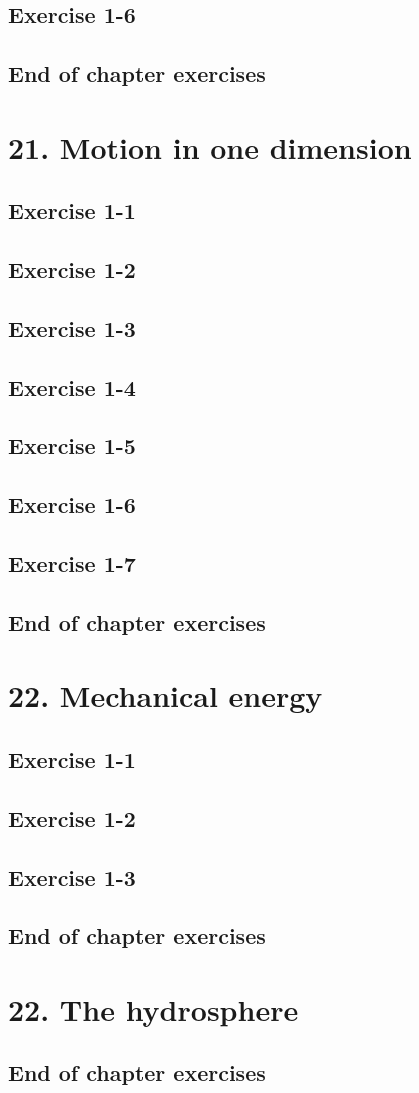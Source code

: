 \subsection{Exercise 1-6}
\subsection{End of chapter exercises}
\section{21. Motion in one dimension}
\subsection{Exercise 1-1}
\subsection{Exercise 1-2}
\subsection{Exercise 1-3}
\subsection{Exercise 1-4}
\subsection{Exercise 1-5}
\subsection{Exercise 1-6}
\subsection{Exercise 1-7}
\subsection{End of chapter exercises}
\section{22. Mechanical energy}
\subsection{Exercise 1-1}
\subsection{Exercise 1-2}
\subsection{Exercise 1-3}
\subsection{End of chapter exercises}
\section{22. The hydrosphere}
\subsection{End of chapter exercises}